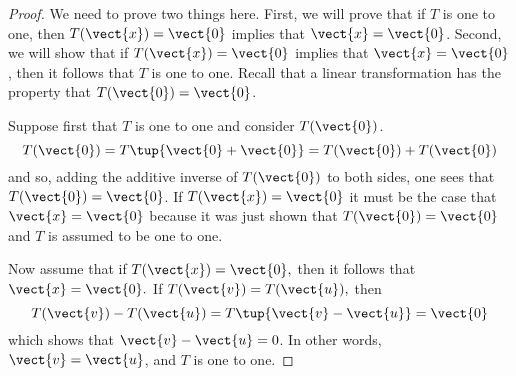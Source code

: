 \begin{proof}
We need to prove two things here. First, we will prove that if $T$ is one to one, then 
$T(\vect{x}) = \vect{0}$ implies that $\vect{x}=\vect{0}$. Second, we will show that if $T(\vect{x})=\vect{0}$ implies that $\vect{x}=\vect{0}$, then 
it follows that $T$ is one to one. Recall that a linear transformation has the property that $T(\vect{0}) = \vect{0}$. 


Suppose first that $T$ is one to one and consider $T(\vect{0})$. 
\begin{equation*}
T(\vect{0})=T\tup{\vect{0}+\vect{0}} =T(\vect{0})+T(\vect{0})
\end{equation*}
and so, adding the additive inverse of $T(\vect{0})$ to both sides, one sees
that $T(\vect{0})=\vect{0}$. If $T(\vect{x})=\vect{0}$ it must be the
case that $\vect{x}=\vect{0}$ because it was just shown that $T(\vect{0})=\vect{0}$ and $T$ is assumed to be one to one. 

Now assume that if $T(\vect{x})=\vect{0},$ then it follows that $\vect{x}=\vect{0}.$ If $T(\vect{v})=T(\vect{u}),$ then 
\[
T(\vect{v})-T(\vect{u})=T\tup{\vect{v}-\vect{u}} =\vect{0}
\]
which shows that $\vect{v}-\vect{u}=0$. In other words, $\vect{v}=\vect{u}$, and $T$ is one to one. 
\end{proof}

